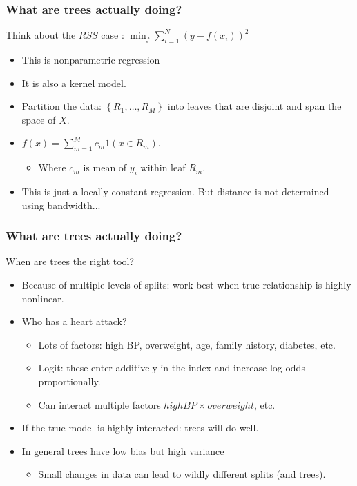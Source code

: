 \documentclass[xcolor=pdftex,dvipsnames,table,mathserif]{beamer}
\begin{document}
\begin{frame}
\frametitle{What are trees actually doing?}
Think about the $RSS$ case : $\min_f \sum_{i=1}^N (y - f(x_i))^2$
\begin{itemize}
\item This is \alert{nonparametric regression}
\item It is also a \alert{kernel model}.
\item Partition the data: $\left\{R_{1}, \ldots, R_{M}\right\}$ into \alert{leaves} that are \alert{disjoint} and \alert{span the space} of $X$.
\item $ f(x)=\sum_{m=1}^{M} c_{m} 1\left(x \in R_{m}\right)$. 
\begin{itemize}
\item Where $c_m$ is mean of $y_i$ within leaf $R_m$.
\end{itemize}
\item This is just a \alert{locally constant} regression. But distance is not determined using bandwidth...
\end{itemize}
\end{frame}


\begin{frame}
\frametitle{What are trees actually doing?}
When are trees the right tool?
\begin{itemize}
\item Because of multiple levels of splits: work best when true relationship is highly nonlinear.
\item Who has a heart attack?
\begin{itemize}
\item Lots of factors: high BP, overweight, age, family history, diabetes, etc.
\item  Logit:  these enter \alert{additively} in the index and increase \alert{log odds proportionally}.
\item Can interact multiple factors $highBP \times overweight$, etc.
\end{itemize}
\item If the true model is highly interacted: trees will do well.
\item In general trees have \alert{low bias} but \alert{high variance}
\begin{itemize}
\item Small changes in data can lead to wildly different splits (and trees).
\end{itemize}
\end{itemize}
\end{frame}
\end{document}
